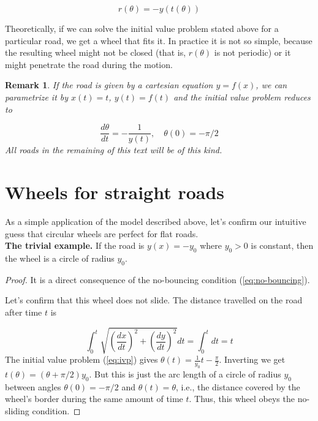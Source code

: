 \documentclass{article}
\theoremstyle{theorem}
\theoremstyle{theorem}
\newtheorem{remark}{Remark}[section]
\begin{document}
\begin{equation}
  r(\theta) = -y(t(\theta))
\end{equation}

Theoretically, if we can solve the initial value problem stated above
for a particular road, we get a wheel that fits it. In practice it is
not so simple, because the resulting wheel might not be closed (that
is, $r(\theta)$ is not periodic) or it might penetrate the road during
the motion.

\begin{remark}
  If the road is given by a cartesian equation $y=f(x)$, we can
  parametrize it by $x(t)=t$, $y(t)=f(t)$ and the initial
  value problem reduces to

  \begin{equation}
    \label{eq:ivp}
    \frac{d\theta}{dt}=-\frac{1}{y(t)}, \quad \theta(0) = -\pi/2
  \end{equation}
  All roads in the remaining of this text will be of this kind.
\end{remark}


\section{Wheels for straight roads}

As a simple application of the model described above, let's confirm
our intuitive guess that circular wheels are perfect for flat roads.
\\

\noindent \textbf{The trivial example.} If the road is $y(x)=-y_0 $
where $y_0>0$ is constant, then the wheel is a circle of radius $y_0$.  

\begin{proof}
  It is a direct consequence of the no-bouncing condition
  (\ref{eq:no-bouncing}).

Let's confirm that this wheel does not slide. The distance travelled on the road
 after time $t$ is

 \begin{equation*}
  \int_0^t{\sqrt{\left(\frac{dx}{dt}\right)^2+\left(\frac{dy}{dt}\right)^2}}
  dt =
  \int_0^t{dt} = t
 \end{equation*}
The initial
 value problem (\ref{eq:ivp}) gives
 $\theta(t)=\frac{1}{y_0}t-\frac{\pi}{2}$. Inverting we get
 $t(\theta)=\left(\theta+\pi/2\right)y_0$. But this is just the arc
 length of a circle of radius $y_0$ between angles $\theta(0)=-\pi/2$ and
 $\theta(t)=\theta$, i.e., the distance covered by the wheel's border during
 the same amount of time $t$. Thus, this wheel obeys the
 no-sliding condition.
\end{proof}
\end{document}
